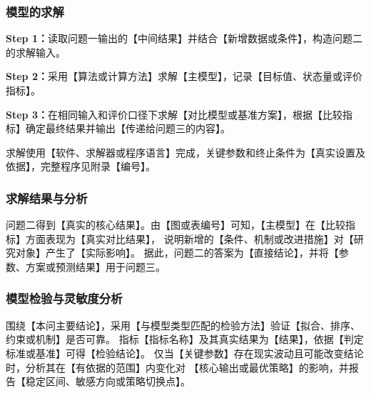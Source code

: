\subsubsection{模型的求解}

\noindent\textbf{Step 1：}读取问题一输出的【中间结果】并结合【新增数据或条件】，构造问题二的求解输入。

\noindent\textbf{Step 2：}采用【算法或计算方法】求解【主模型】，记录【目标值、状态量或评价指标】。

\noindent\textbf{Step 3：}在相同输入和评价口径下求解【对比模型或基准方案】，根据【比较指标】确定最终结果并输出【传递给问题三的内容】。

求解使用【软件、求解器或程序语言】完成，关键参数和终止条件为【真实设置及依据】，完整程序见附录【编号】。

\subsubsection{求解结果与分析}

问题二得到【真实的核心结果】。由【图或表编号】可知，【主模型】在【比较指标】方面表现为【真实对比结果】，
说明新增的【条件、机制或改进措施】对【研究对象】产生了【实际影响】。
据此，问题二的答案为【直接结论】，并将【参数、方案或预测结果】用于问题三。

\subsubsection{模型检验与灵敏度分析}

围绕【本问主要结论】，采用【与模型类型匹配的检验方法】验证【拟合、排序、约束或机制】是否可靠。
指标【指标名称】及其真实结果为【结果】，依据【判定标准或基准】可得【检验结论】。
仅当【关键参数】存在现实波动且可能改变结论时，分析其在【有依据的范围】内变化对
【核心输出或最优策略】的影响，并报告【稳定区间、敏感方向或策略切换点】。
